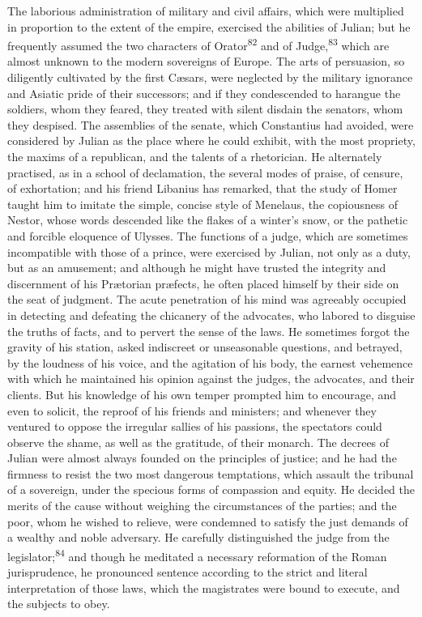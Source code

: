The laborious administration of military and civil affairs, which
were multiplied in proportion to the extent of the empire,
exercised the abilities of Julian; but he frequently assumed the
two characters of Orator\textsuperscript{82} and of Judge,\textsuperscript{83} which are almost
unknown to the modern sovereigns of Europe. The arts of
persuasion, so diligently cultivated by the first Cæsars, were
neglected by the military ignorance and Asiatic pride of their
successors; and if they condescended to harangue the soldiers,
whom they feared, they treated with silent disdain the senators,
whom they despised. The assemblies of the senate, which
Constantius had avoided, were considered by Julian as the place
where he could exhibit, with the most propriety, the maxims of a
republican, and the talents of a rhetorician. He alternately
practised, as in a school of declamation, the several modes of
praise, of censure, of exhortation; and his friend Libanius has
remarked, that the study of Homer taught him to imitate the
simple, concise style of Menelaus, the copiousness of Nestor,
whose words descended like the flakes of a winter’s snow, or the
pathetic and forcible eloquence of Ulysses. The functions of a
judge, which are sometimes incompatible with those of a prince,
were exercised by Julian, not only as a duty, but as an
amusement; and although he might have trusted the integrity and
discernment of his Prætorian præfects, he often placed himself by
their side on the seat of judgment. The acute penetration of his
mind was agreeably occupied in detecting and defeating the
chicanery of the advocates, who labored to disguise the truths of
facts, and to pervert the sense of the laws. He sometimes forgot
the gravity of his station, asked indiscreet or unseasonable
questions, and betrayed, by the loudness of his voice, and the
agitation of his body, the earnest vehemence with which he
maintained his opinion against the judges, the advocates, and
their clients. But his knowledge of his own temper prompted him
to encourage, and even to solicit, the reproof of his friends and
ministers; and whenever they ventured to oppose the irregular
sallies of his passions, the spectators could observe the shame,
as well as the gratitude, of their monarch. The decrees of Julian
were almost always founded on the principles of justice; and he
had the firmness to resist the two most dangerous temptations,
which assault the tribunal of a sovereign, under the specious
forms of compassion and equity. He decided the merits of the
cause without weighing the circumstances of the parties; and the
poor, whom he wished to relieve, were condemned to satisfy the
just demands of a wealthy and noble adversary. He carefully
distinguished the judge from the legislator;\textsuperscript{84} and though he
meditated a necessary reformation of the Roman jurisprudence, he
pronounced sentence according to the strict and literal
interpretation of those laws, which the magistrates were bound to
execute, and the subjects to obey.

